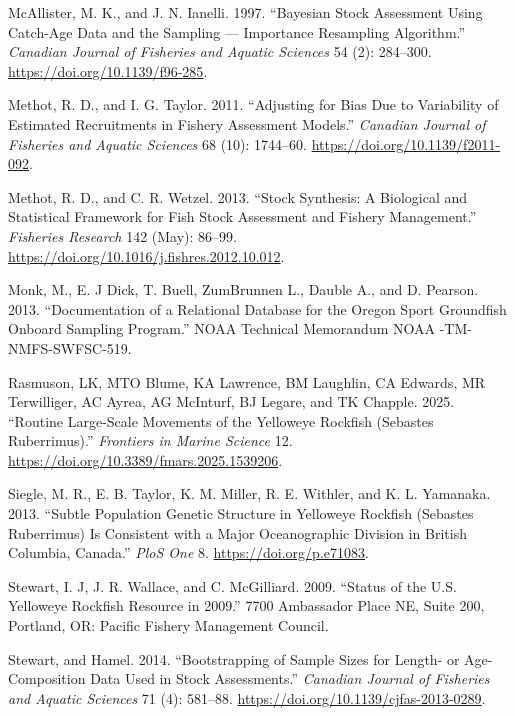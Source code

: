 \documentclass[
  english,
]{article}
\newlength{\cslhangindent}
\newenvironment{CSLReferences}[2] %
 {\begin{list}{}{%
  \setlength{\itemindent}{0pt}
  \setlength{\leftmargin}{0pt}
  \setlength{\parsep}{0pt}
  \ifodd #1
   \setlength{\leftmargin}{\cslhangindent}
   \setlength{\itemindent}{-1\cslhangindent}
  \fi
  \setlength{\itemsep}{#2\baselineskip}}}
 {\end{list}}
\begin{document}
\begin{CSLReferences}{1}{0}
McAllister, M. K., and J. N. Ianelli. 1997. {``Bayesian Stock Assessment
Using Catch-Age Data and the Sampling --- Importance Resampling
Algorithm.''} \emph{Canadian Journal of Fisheries and Aquatic Sciences}
54 (2): 284--300. \url{https://doi.org/10.1139/f96-285}.

Methot, R. D., and I. G. Taylor. 2011. {``Adjusting for Bias Due to
Variability of Estimated Recruitments in Fishery Assessment Models.''}
\emph{Canadian Journal of Fisheries and Aquatic Sciences} 68 (10):
1744--60. \url{https://doi.org/10.1139/f2011-092}.

Methot, R. D., and C. R. Wetzel. 2013. {``Stock Synthesis: A Biological
and Statistical Framework for Fish Stock Assessment and Fishery
Management.''} \emph{Fisheries Research} 142 (May): 86--99.
\url{https://doi.org/10.1016/j.fishres.2012.10.012}.

Monk, M., E. J Dick, T. Buell, ZumBrunnen L., Dauble A., and D. Pearson.
2013. {``Documentation of a Relational Database for the Oregon Sport
Groundfish Onboard Sampling Program.''} NOAA Technical Memorandum NOAA
-TM-NMFS-SWFSC-519.

Rasmuson, LK, MTO Blume, KA Lawrence, BM Laughlin, CA Edwards, MR
Terwilliger, AC Ayrea, AG McInturf, BJ Legare, and TK Chapple. 2025.
{``Routine Large-Scale Movements of the Yelloweye Rockfish (Sebastes
Ruberrimus).''} \emph{Frontiers in Marine Science} 12.
\url{https://doi.org/10.3389/fmars.2025.1539206}.

Siegle, M. R., E. B. Taylor, K. M. Miller, R. E. Withler, and K. L.
Yamanaka. 2013. {``Subtle Population Genetic Structure in Yelloweye
Rockfish (Sebastes Ruberrimus) Is Consistent with a Major Oceanographic
Division in British Columbia, Canada.''} \emph{PloS One} 8.
\url{https://doi.org/p.e71083}.

Stewart, I. J, J. R. Wallace, and C. McGilliard. 2009. {``Status of the
{U}.{S}. Yelloweye Rockfish Resource in 2009.''} 7700 Ambassador Place
NE, Suite 200, Portland, OR: Pacific Fishery Management Council.

Stewart, and Hamel. 2014. {``Bootstrapping of Sample Sizes for Length-
or Age-Composition Data Used in Stock Assessments.''} \emph{Canadian
Journal of Fisheries and Aquatic Sciences} 71 (4): 581--88.
\url{https://doi.org/10.1139/cjfas-2013-0289}.


\end{CSLReferences}
\end{document}
